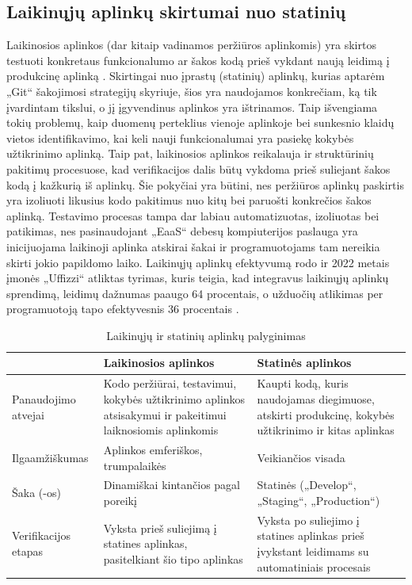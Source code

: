 \documentclass{VUMIFPSkursinis}
\begin{document}
\subsection{Laikinųjų aplinkų skirtumai nuo statinių}


Laikinosios aplinkos (dar kitaip vadinamos peržiūros aplinkomis) yra skirtos testuoti konkretaus funkcionalumo ar šakos kodą prieš vykdant naują leidimą į produkcinę aplinką \cite{SaltVienuoliktas}. Skirtingai nuo įprastų (statinių) aplinkų, kurias aptarėm „Git“ šakojimosi strategijų skyriuje, šios yra naudojamos konkrečiam, ką tik įvardintam tikslui, o jį įgyvendinus aplinkos yra ištrinamos. Taip išvengiama tokių problemų, kaip duomenų perteklius vienoje aplinkoje bei sunkesnio klaidų vietos identifikavimo, kai keli nauji funkcionalumai yra pasiekę kokybės užtikrinimo aplinką. Taip pat, laikinosios aplinkos reikalauja ir struktūrinių pakitimų procesuose, kad verifikacijos dalis būtų vykdoma prieš suliejant šakos kodą į kažkurią iš aplinkų. Šie pokyčiai yra būtini, nes peržiūros aplinkų paskirtis yra izoliuoti likusius kodo pakitimus nuo kitų bei paruošti konkrečios šakos aplinką. Testavimo procesas tampa dar labiau automatizuotas, izoliuotas bei patikimas, nes pasinaudojant „EaaS“ debesų kompiuterijos paslauga yra inicijuojama laikinoji aplinka atskirai šakai ir programuotojams tam nereikia skirti jokio papildomo laiko. Laikinųjų aplinkų efektyvumą rodo ir 2022 metais įmonės „Uffizzi“ atliktas tyrimas, kuris teigia, kad integravus laikinųjų aplinkų sprendimą, leidimų dažnumas paaugo 64 procentais, o užduočių atlikimas per programuotoją tapo efektyvesnis 36 procentais \cite{SaltDvyliktas}.

\begin{table}[H]\footnotesize
  \centering
  \caption{Laikinųjų ir statinių aplinkų palyginimas}
  {\begin{tabular}{|l|p{55mm}|p{55mm}|} \hline
     & Laikinosios aplinkos & Statinės aplinkos \\
    \hline
    Panaudojimo atvejai & Kodo peržiūrai, testavimui, kokybės užtikrinimo aplinkos atsisakymui ir pakeitimui laiknosiomis aplinkomis & Kaupti kodą, kuris naudojamas diegimuose, atskirti produkcinę, kokybės užtikrinimo ir kitas aplinkas     \\
    \hline
    Ilgaamžiškumas & Aplinkos emferiškos, trumpalaikės & Veikiančios visada       \\
    \hline
    Šaka (-os) & Dinamiškai kintančios pagal poreikį & Statinės \newline („Develop“, „Staging“, „Production“) \\
    \hline
    Verifikacijos etapas  & Vyksta prieš suliejimą į statines aplinkas, pasitelkiant šio tipo aplinkas & Vyksta po suliejimo į statines aplinkas prieš įvykstant leidimams su automatiniais procesais \\
    \hline
  \end{tabular}}
  \label{tab:table example}
\end{table}
\end{document}
